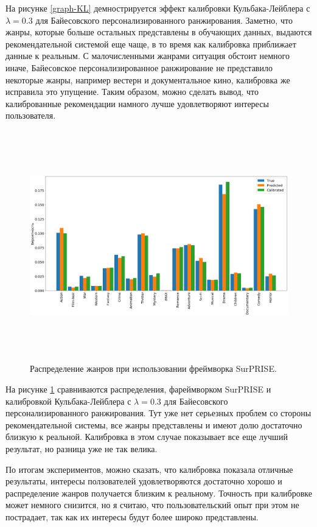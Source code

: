 На рисунке \ref{graph-KL} демнострируется эффект калибровки Кульбака-Лейблера с ${\lambda=0.3}$ для Байесовского персонализированного ранжирования.
Заметно, что жанры, которые больше остальных представлены в обучающих данных, выдаются рекомендательной системой еще чаще,
в то время как калибровка приближает данные к реальным. С малочисленными жанрами ситуация обстоит немного иначе,
Байесовское персонализированное ранжирование не представило некоторые жанры, например вестерн и документальное кино, калибровка же
исправила это упущение. Таким образом, можно сделать вывод, что калиброванные рекомендации
намного лучше удовлетворяют интересы пользователя.


\pagebreak

   \begin{figure}[ht]
   \begin{flushleft}
      \includegraphics[width=17.5cm, height=10cm]{images/cal_surp.png}
   
   \caption{
   \label{graph-SUR}
        Распределение жанров при использовании фреймворка SurPRISE.}
   \end {flushleft}
   \end {figure}



      На рисунке \ref{graph-SUR} сравниваются распределения, фареймворком SurPRISE и калибровкой Кульбака-Лейблера с ${\lambda=0.3}$ для Байесовского персонализированного ранжирования.
      Тут уже нет серьезных проблем со стороны рекомендательной системы, все жанры представлены и
      имеют долю достаточно близкую к реальной. Калибровка в этом случае показывает все еще лучший результат, но разница уже не так велика.

      По итогам экспериментов, можно сказать, что калибровка показала отличные результаты,
      интересы ползователей удовлетворяются достаточно хорошо и распределение жанров получается близким к реальному.
      Точность при калибровке может немного снизится, но я считаю, что пользовательский опыт при этом не пострадает, так как их интересы будут более широко представлены.


\pagebreak

